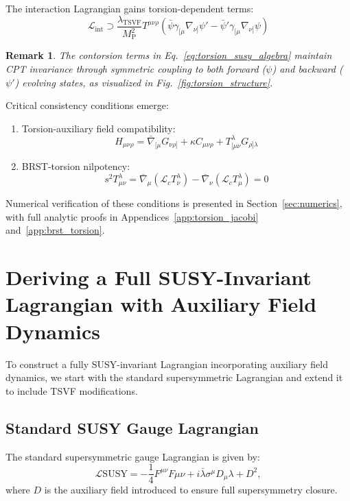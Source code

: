 \documentclass[12pt, onecolumn]{article}
\newtheorem{remark}{Remark}[section]
\theoremstyle{definition}
\newcommand{\tsvf}{\lambda_{\mathrm{TSVF}}}
\newcommand{\Mp}{M_{\mathrm{P}}}
\numberwithin{equation}{section}
\begin{document}
The interaction Lagrangian gains torsion-dependent terms:
\begin{equation}
\mathcal{L}_{\text{int}} \supset \frac{\tsvf}{\Mp^2} T^{\mu\nu\rho}\left(\bar{\psi}\gamma_{[\mu}\nabla_{\nu]}\psi' - \bar{\psi}'\gamma_{[\mu}\nabla_{\nu]}\psi\right)
\label{eq:torsion_interaction}
\end{equation}

\begin{remark}
The contorsion terms in Eq.~\eqref{eq:torsion_susy_algebra} maintain CPT invariance through symmetric coupling to both forward (\(\psi\)) and backward (\(\psi'\)) evolving states, as visualized in Fig.~\ref{fig:torsion_structure}.
\end{remark}

Critical consistency conditions emerge:
\begin{enumerate}
\item Torsion-auxiliary field compatibility:
\begin{equation}
H_{\mu\nu\rho} = \bar{\nabla}_{[\mu}G_{\nu\rho]} + \kappa C_{\mu\nu\rho} + T^\lambda_{[\mu\nu}G_{\rho]\lambda}
\end{equation}

\item BRST-torsion nilpotency:
\begin{equation}
s^2T^\lambda_{\mu\nu} = \bar{\nabla}_\mu(\mathcal{L}_c T^\lambda_{\nu}) - \bar{\nabla}_\nu(\mathcal{L}_c T^\lambda_{\mu}) = 0
\end{equation}
\end{enumerate}

Numerical verification of these conditions is presented in Section~\ref{sec:numerics}, with full analytic proofs in Appendices~\ref{app:torsion_jacobi} and~\ref{app:brst_torsion}.



\section{Deriving a Full SUSY-Invariant Lagrangian with Auxiliary Field Dynamics}
To construct a fully SUSY-invariant Lagrangian incorporating auxiliary field dynamics, we start with the standard supersymmetric Lagrangian and extend it to include TSVF modifications.

\subsection{Standard SUSY Gauge Lagrangian}
The standard supersymmetric gauge Lagrangian is given by:
\begin{equation}
\mathcal{L}{\text{SUSY}} = -\frac{1}{4} F^{\mu\nu} F{\mu\nu} + i \bar{\lambda} \sigma^\mu D_\mu \lambda + D^2,
\end{equation}
where $D$ is the auxiliary field introduced to ensure full supersymmetry closure.
\end{document}
